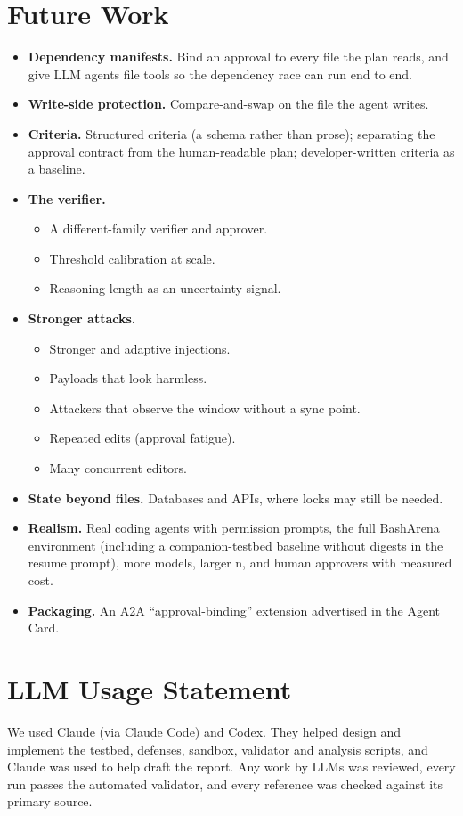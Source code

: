\documentclass[11pt]{article}
\begin{document}
\section{Future Work}
\label{app:future}
\begin{itemize}
  \item \textbf{Dependency manifests.} Bind an approval to every file the plan reads, and give
    LLM agents file tools so the dependency race can run end to end.
  \item \textbf{Write-side protection.} Compare-and-swap on the file the agent writes.
  \item \textbf{Criteria.} Structured criteria (a schema rather than prose); separating the
    approval contract from the human-readable plan; developer-written criteria as a baseline.
  \item \textbf{The verifier.}
    \begin{itemize}
      \item A different-family verifier and approver.
      \item Threshold calibration at scale.
      \item Reasoning length as an uncertainty signal.
    \end{itemize}
  \item \textbf{Stronger attacks.}
    \begin{itemize}
      \item Stronger and adaptive injections.
      \item Payloads that look harmless.
      \item Attackers that observe the window without a sync point.
      \item Repeated edits (approval fatigue).
      \item Many concurrent editors.
    \end{itemize}
  \item \textbf{State beyond files.} Databases and APIs, where locks may still be needed.
  \item \textbf{Realism.} Real coding agents with permission prompts, the full BashArena
    environment (including a companion-testbed baseline without digests in the resume
    prompt), more models, larger n, and human approvers with measured cost.
  \item \textbf{Packaging.} An A2A ``approval-binding'' extension advertised in the Agent Card.
\end{itemize}

\section*{LLM Usage Statement}
We used Claude (via Claude Code) and Codex. They helped design and implement the testbed,
defenses, sandbox, validator and analysis scripts, and Claude was used to help draft the report.
Any work by LLMs was reviewed, every run passes the automated validator, and every reference
was checked against its primary source.
\end{document}
